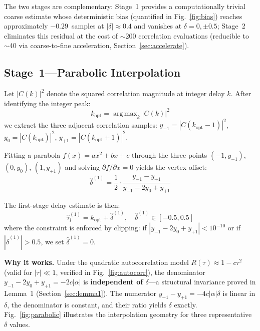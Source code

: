 \documentclass[a4paper,fleqn]{cas-dc}
\DeclareMathOperator*{\argmax}{arg\,max}
\begin{document}
The two stages are complementary: Stage~1 provides a computationally trivial coarse estimate whose deterministic bias (quantified in Fig.~\ref{fig:bias}) reaches approximately $-0.29$~samples at $|\delta|\approx0.4$ and vanishes at $\delta=0,\pm0.5$; Stage~2 eliminates this residual at the cost of $\sim$200 correlation evaluations (reducible to $\sim$40 via coarse-to-fine acceleration, Section~\ref{sec:accelerate}).

\subsection{Stage~1---Parabolic Interpolation}

Let $|C(k)|^2$ denote the squared correlation magnitude at integer delay $k$. After identifying the integer peak:
\begin{equation}
k_{\text{opt}} = \argmax_k |C(k)|^2
\label{eq:kopt}
\end{equation}
we extract the three adjacent correlation samples: $y_{-1} = |C(k_{\text{opt}}-1)|^2$, $y_0 = |C(k_{\text{opt}})|^2$, $y_{+1} = |C(k_{\text{opt}}+1)|^2$.

Fitting a parabola $f(x) = ax^2 + bx + c$ through the three points $(-1, y_{-1})$, $(0, y_0)$, $(1, y_{+1})$ and solving $\partial f/\partial x = 0$ yields the vertex offset:
\begin{equation}
\hat{\delta}^{(1)} = \frac{1}{2} \cdot \frac{y_{-1} - y_{+1}}{y_{-1} - 2y_0 + y_{+1}}
\label{eq:delta1}
\end{equation}

The first-stage delay estimate is then:
\begin{equation}
\hat{\tau}_l^{(1)} = k_{\text{opt}} + \hat{\delta}^{(1)}, \quad \hat{\delta}^{(1)} \in [-0.5, 0.5]
\label{eq:tau1}
\end{equation}
where the constraint is enforced by clipping: if $|y_{-1} - 2y_0 + y_{+1}| < 10^{-10}$ or if $|\hat{\delta}^{(1)}| > 0.5$, we set $\hat{\delta}^{(1)} = 0$.

\textbf{Why it works.} Under the quadratic autocorrelation model $R(\tau) \approx 1 - c\tau^2$ (valid for $|\tau| \ll 1$, verified in Fig.~\ref{fig:autocorr}), the denominator $y_{-1} - 2y_0 + y_{+1} = -2c|\alpha|$ is \textbf{independent of $\delta$}---a structural invariance proved in Lemma~1 (Section~\ref{sec:lemma1}). The numerator $y_{-1} - y_{+1} = -4c|\alpha|\delta$ is linear in $\delta$, the denominator is constant, and their ratio yields $\delta$ exactly. Fig.~\ref{fig:parabolic} illustrates the interpolation geometry for three representative $\delta$ values.
\end{document}
